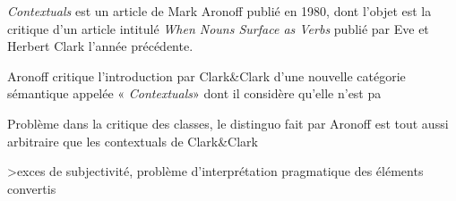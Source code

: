 \documentclass[a4paper,12pt]{article}
\author{Arthur Lapraye}
\begin{document}
 
 \maketitle
 
 \textit{Contextuals} est un article de Mark Aronoff publié en 1980, dont l'objet est la critique d'un article intitulé 
 \textit{When Nouns Surface as Verbs} publié par Eve et Herbert Clark l'année précédente. 
 
 Aronoff critique l'introduction par Clark&Clark d'une nouvelle catégorie sémantique appelée « \textit{Contextuals}» dont il considère qu'elle n'est pa
 
 
 Problème dans la critique des classes, le distinguo fait par Aronoff est tout aussi arbitraire que les contextuals de Clark&Clark 
 
 >exces de subjectivité, problème d'interprétation pragmatique des éléments convertis
 
 
  
\end{document}

